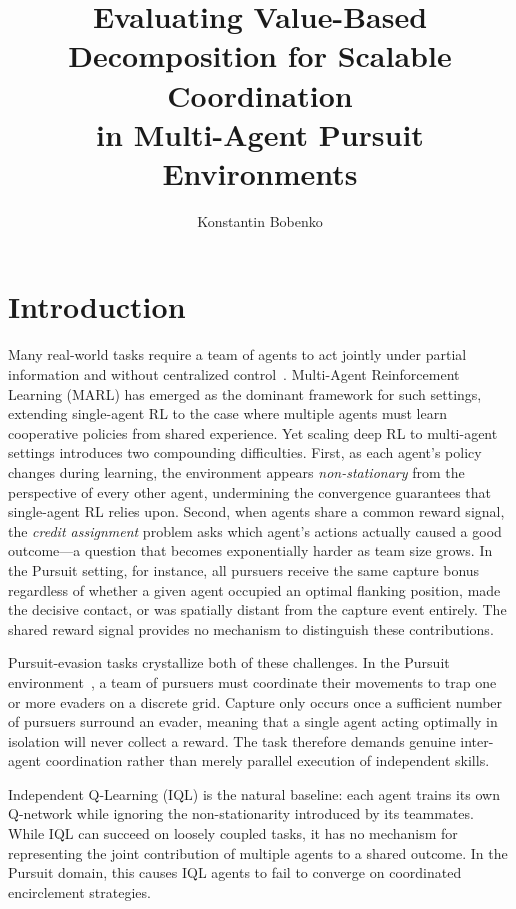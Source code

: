 \documentclass[sigconf,screen]{acmart}
\title{Evaluating Value-Based Decomposition for Scalable Coordination\\in Multi-Agent Pursuit Environments}
\author{Konstantin Bobenko}
\affiliation{
  \institution{Hasso Plattner Institute, University of Potsdam}
  \country{Germany}
}
\begin{document}
\maketitle

\section{Introduction}

Many real-world tasks require a team of agents to act jointly under partial information and without centralized control~\cite{gupta2017cooperative}. Multi-Agent Reinforcement Learning (MARL) has emerged as the dominant framework for such settings, extending single-agent RL to the case where multiple agents must learn cooperative policies from shared experience. Yet scaling deep RL to multi-agent settings introduces two compounding difficulties. First, as each agent's policy changes during learning, the environment appears \textit{non-stationary} from the perspective of every other agent, undermining the convergence guarantees that single-agent RL relies upon. Second, when agents share a common reward signal, the \textit{credit assignment} problem asks which agent's actions actually caused a good outcome—a question that becomes exponentially harder as team size grows. In the Pursuit setting, for instance, all pursuers receive the same capture bonus regardless of whether a given agent occupied an optimal flanking position, made the decisive contact, or was spatially distant from the capture event entirely. The shared reward signal provides no mechanism to distinguish these contributions.

Pursuit-evasion tasks crystallize both of these challenges. In the  Pursuit environment~\cite{gupta2017cooperative}, a team of pursuers must coordinate their movements to trap one or more evaders on a discrete grid. Capture only occurs once a sufficient number of pursuers surround an evader, meaning that a single agent acting optimally in isolation will never collect a reward. The task therefore demands genuine inter-agent coordination rather than merely parallel execution of independent skills.

Independent Q-Learning (IQL) is the natural baseline: each agent trains its own Q-network while ignoring the non-stationarity introduced by its teammates. While IQL can succeed on loosely coupled tasks, it has no mechanism for representing the joint contribution of multiple agents to a shared outcome. In the Pursuit domain, this causes IQL agents to fail to converge on coordinated encirclement strategies.
\end{document}
